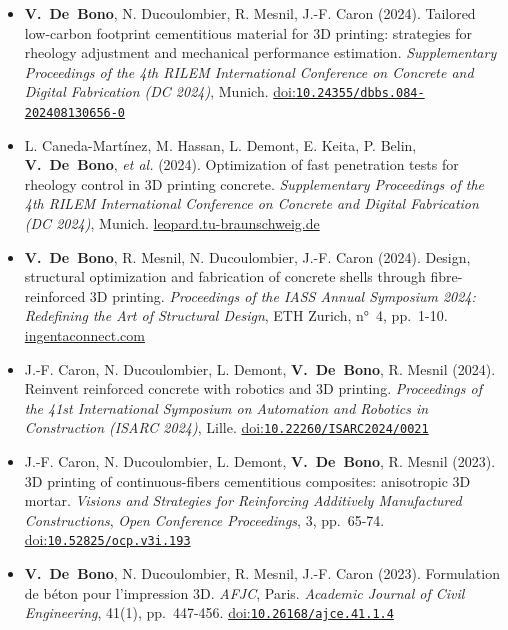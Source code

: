 \documentclass[11pt,a4paper]{article}
\newcommand{\doi}[1]{\href{https://doi.org/#1}{doi:\nolinkurl{#1}}}
\newcommand{\me}{\textbf{V.~De~Bono}}
\newenvironment{publis}[1]%
  {\begin{itemize}[label={}, leftmargin=1.2em, labelwidth=0pt, labelsep=0pt,
     itemindent=-1.2em, itemsep=0.45em, topsep=0.3em]}%
  {\end{itemize}}
\begin{document}
\begin{publis}{C}
  \item \me, N. Ducoulombier, R. Mesnil, J.-F. Caron (2024).
  Tailored low-carbon footprint cementitious material for 3D printing: strategies for rheology adjustment and mechanical performance estimation.
  \emph{Supplementary Proceedings of the 4th RILEM International Conference on Concrete and Digital Fabrication (DC 2024)}, Munich.
  \doi{10.24355/dbbs.084-202408130656-0}

  \item L. Caneda-Martínez, M. Hassan, L. Demont, E. Keita, P. Belin, \me, \emph{et al.} (2024).
  Optimization of fast penetration tests for rheology control in 3D printing concrete.
  \emph{Supplementary Proceedings of the 4th RILEM International Conference on Concrete and Digital Fabrication (DC 2024)}, Munich.
  \href{https://leopard.tu-braunschweig.de/receive/dbbs_mods_00077815}{leopard.tu-braunschweig.de}

  \item \me, R. Mesnil, N. Ducoulombier, J.-F. Caron (2024).
  Design, structural optimization and fabrication of concrete shells through fibre-reinforced 3D printing.
  \emph{Proceedings of the IASS Annual Symposium 2024: Redefining the Art of Structural Design}, ETH Zurich, n°~4, pp.~1-10.
  \href{https://www.ingentaconnect.com/contentone/iass/piass/2024/00002024/00000004/art00009}{ingentaconnect.com}

  \item J.-F. Caron, N. Ducoulombier, L. Demont, \me, R. Mesnil (2024).
  Reinvent reinforced concrete with robotics and 3D printing.
  \emph{Proceedings of the 41st International Symposium on Automation and Robotics in Construction (ISARC 2024)}, Lille.
  \doi{10.22260/ISARC2024/0021}

  \item J.-F. Caron, N. Ducoulombier, L. Demont, \me, R. Mesnil (2023).
  3D printing of continuous-fibers cementitious composites: anisotropic 3D mortar.
  \emph{Visions and Strategies for Reinforcing Additively Manufactured Constructions}, \emph{Open Conference Proceedings}, 3, pp.~65-74.
  \doi{10.52825/ocp.v3i.193}

  \item \me, N. Ducoulombier, R. Mesnil, J.-F. Caron (2023).
  Formulation de béton pour l'impression 3D.
  \emph{AFJC}, Paris. \emph{Academic Journal of Civil Engineering}, 41(1), pp.~447-456.
  \doi{10.26168/ajce.41.1.4}
\end{publis}

\end{document}
